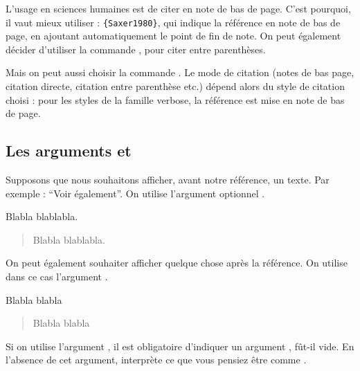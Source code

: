 \begin{quotation}
\cite{Saxer1980}
\end{quotation}

L'usage en sciences humaines est de citer en note de bas de page. C'est pourquoi, il vaut mieux utiliser : \verb|{Saxer1980}|,\label{footcite} qui indique la référence en note de bas de page, en ajoutant automatiquement le point de fin de note. On peut également décider d'utiliser la commande , pour citer entre parenthèses. 

Mais on peut aussi choisir la commande . Le mode de citation (notes de bas page, citation directe, citation entre parenthèse etc.) dépend alors du style de citation choisi : pour les styles de la famille verbose, la référence est mise en note de bas de page. 

\subsection{Les arguments  et }

Supposons que nous souhaitons afficher, avant notre référence, un texte. Par exemple : \enquote{Voir également}. On utilise l'argument optionnel .

\begin{latexcode}
Blabla \autocite[Voir également][]{Saxer1980} blablabla.
\end{latexcode}

\begin{quotation}
Blabla \cite[Voir également][]{Saxer1980} blablabla.
\end{quotation}



On peut également souhaiter afficher quelque chose après la référence. On utilise dans ce cas l'argument .

\begin{latexcode}
Blabla \autocite[Voir également][qui porte sur un
sujet similaire.]{Saxer1980} blabla
\end{latexcode}

\begin{quotation}
Blabla \parencite[Voir également][qui porte sur un sujet similaire.]{Saxer1980} blabla
\end{quotation}

\begin{attention}
Si on utilise l'argument , il est obligatoire d'indiquer un argument , fût-il vide. En l'absence de cet argument,  interprète  ce que vous pensiez être  comme .
\end{attention}

